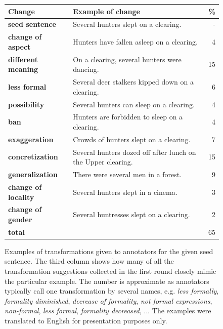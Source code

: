 \begin{figure}[tb!]
\centering
\begin{tabular}{lp{9cm}r}
\toprule %
\textbf{Change} & \textbf{Example of change} & \textbf{\%} \\
\midrule %
\textbf{seed sentence} & Several hunters slept on a clearing. & - \\

\textbf{change of aspect} & Hunters have fallen asleep on a clearing. & 4 \\

\textbf{different meaning} & On a clearing, several hunters were dancing. & 15 \\

\textbf{less formal} & Several deer stalkers kipped down on a clearing. & 6 \\

\textbf{possibility} &  Several hunters can sleep on a clearing. & 4 \\

\textbf{ban} & Hunters are forbidden to sleep on a clearing. & 4 \\

\textbf{exaggeration} & Crowds of hunters slept on a clearing. & 7 \\

\textbf{concretization} & Several hunters dozed off after lunch on the Upper clearing. & 15 \\

\textbf{generalization} & There were several men in a forest. & 9 \\

\textbf{change of locality} & Several hunters slept in a cinema. & 3 \\

\textbf{change of gender} & Several huntresses slept on a clearing. & 2 \\
\midrule %
\textbf{total} &  & 65 \\
\bottomrule %
\end{tabular}
\caption{Examples of transformations given to annotators for the given seed sentence. The third column shows how many of all the transformation suggestions collected in the first round closely mimic the particular example. The number is approximate as annotators typically call one transformation by several names, e.g. \textit{less formally},  \textit{formality diminished}, \textit{decrease of formality}, \textit{not formal expressions}, \textit{non-formal}, \textit{less formal}, \textit{formality decreased}, ... The examples were translated to English for presentation purposes only.}
\label{tab:first_round_examples}
\end{figure}

